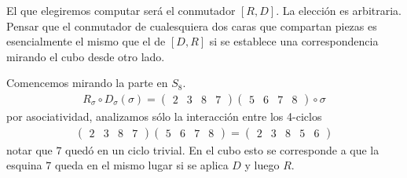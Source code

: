 \documentclass{article}
\theoremstyle{definition}
\begin{document}
El que elegiremos computar será el conmutador $[R,D]$. La elección es arbitraria. Pensar que el conmutador de cualesquiera dos caras que compartan piezas es esencialmente el mismo que el de $[D,R]$ si se establece una correspondencia mirando el cubo desde otro lado.

Comencemos mirando la parte en $S_8$.
\begin{align*}
    R_\sigma\circ D_\sigma(\sigma)=\begin{pmatrix}
                                       2 & 3 & 8 & 7
                                   \end{pmatrix}\begin{pmatrix}
                                                    5 & 6 & 7 & 8
                                                \end{pmatrix}\circ \sigma
\end{align*}
por asociatividad, analizamos sólo la interacción entre los 4-ciclos
\begin{align*}
    \begin{pmatrix}
        2 & 3 & 8 & 7
    \end{pmatrix}\begin{pmatrix}
                     5 & 6 & 7 & 8
                 \end{pmatrix}=
    \begin{pmatrix}
        2 & 3 & 8 & 5 & 6
    \end{pmatrix}
\end{align*}
notar que $7$ quedó en un ciclo trivial. En el cubo esto se corresponde a que la esquina $7$ queda en el mismo lugar si se aplica $D$ y luego $R$.
\end{document}
